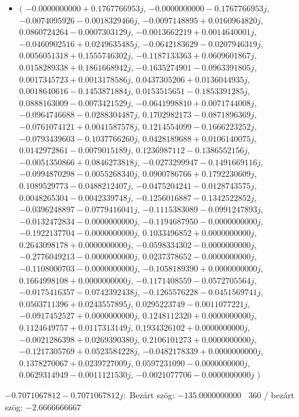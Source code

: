 \documentclass[14pt,a4paper]{article}
\begin{document}
\begin{itemize}
\item
$\big($
$-0.0000000000+0.1767766953j$, $-0.0000000000-0.1767766953j$, $-0.0074095926-0.0018329466j$, $-0.0097148895+0.0160964820j$, $0.0860724264-0.0007303129j$, $-0.0013662219+0.0014640001j$, $-0.0460902516+0.0249635485j$, $-0.0642183629-0.0207946319j$, $0.0056051318+0.1555746302j$, $-0.1187133363+0.0609601867j$, $0.0158289338+0.1861668942j$, $-0.1635274901-0.0963391805j$, $0.0017345723+0.0013178586j$, $0.0437305206+0.0136044935j$, $0.0018640616-0.1453871884j$, $0.0153515651-0.1853391285j$, $0.0888163009-0.0073421529j$, $-0.0641998810+0.0071744008j$, $-0.0964746688-0.0288304487j$, $0.1702982173-0.0871896369j$, $-0.0761074121+0.0041587578j$, $0.1214554099-0.1666223252j$, $-0.0793439603-0.1037766260j$, $0.0428189688+0.0106140075j$, $0.0142972861-0.0079015189j$, $0.1236987112-0.1386552156j$, $-0.0051350866+0.0846273818j$, $-0.0273299947-0.1491669116j$, $-0.0994870298-0.0055268340j$, $0.0900786766+0.1792230609j$, $0.1089529773-0.0488212407j$, $-0.0475204241-0.0128743575j$, $0.0048265304-0.0042339748j$, $-0.1256016887-0.1342522852j$, $-0.0396248897-0.0779416041j$, $-0.1115383089-0.0991247893j$, $-0.0132472834-0.0000000000j$, $-0.1194687950-0.0000000000j$, $-0.1922137704-0.0000000000j$, $0.1033496852+0.0000000000j$, $0.2643098178+0.0000000000j$, $-0.0598334302-0.0000000000j$, $-0.2776049213-0.0000000000j$, $0.0237378652-0.0000000000j$, $-0.1108000703-0.0000000000j$, $-0.1058189390+0.0000000000j$, $0.1664998108+0.0000000000j$, $-0.1171408559-0.0572705564j$, $-0.0175416357-0.0742392438j$, $-0.1265576228-0.0451569741j$, $0.0503711396+0.0243557895j$, $0.0295223749-0.0011077221j$, $-0.0917452527+0.0000000000j$, $0.1248112320+0.0000000000j$, $0.1124649757+0.0117313149j$, $0.1934326102+0.0000000000j$, $-0.0021286398+0.0269390380j$, $0.2106101273+0.0000000000j$, $-0.1217305769+0.0523584228j$, $-0.0482178339+0.0000000000j$, $0.1378270067+0.0239727009j$, $0.0597231090-0.0000000000j$, $0.0629314949-0.0011121530j$, $-0.0021077706-0.0000000000j$
$\big)$
\end{itemize}
$-0.7071067812-0.7071067812j$:\
Bezárt szög: $-135.0000000000$ \
360 / bezárt szög: $-2.6666666667$\
\end{document}
